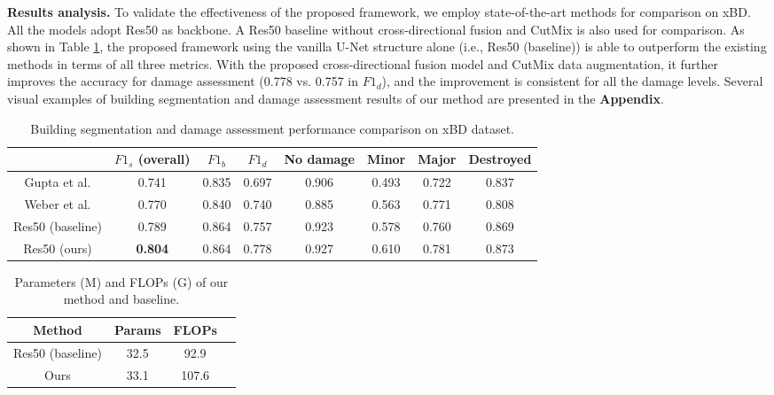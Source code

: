 \documentclass{article}
\begin{document}
\textbf{Results analysis.}
To validate the effectiveness of the proposed framework, we employ state-of-the-art methods for comparison on xBD. All the models adopt Res50 as backbone. A Res50 baseline without cross-directional fusion and CutMix is also used for comparison. As shown in Table \ref{tabResults}, the proposed framework using the vanilla U-Net structure alone (i.e., Res50 (baseline)) is able to outperform the existing methods in terms of all three metrics. With the proposed cross-directional fusion model and CutMix data augmentation, it further improves the accuracy for damage assessment (0.778 vs. 0.757 in $F1_d$), and the improvement is consistent for all the damage levels. 
Several visual examples of building segmentation and damage assessment results of our method are presented in the \textbf{Appendix}. 
\begin{table}
  \caption{Building segmentation and damage assessment performance comparison on xBD dataset.}
  \footnotesize
  \centering
  \begin{tabular}{cccccccc}
    \toprule
         & $F1_s$ (overall) & $F1_b$ & $F1_d$  & No damage    & Minor & Major & Destroyed \\
    \midrule
    Gupta et al. \cite{gupta2020rescuenet} & 0.741 & 0.835 &	0.697 &	0.906 &	0.493 &	0.722 &	0.837 \\
   Weber et al. \cite{weber2020building}  & 0.770 &	0.840 &	0.740 &	0.885 &	0.563 &	0.771 &	0.808   \\
   Res50 (baseline) & 0.789 & 0.864 &	0.757 &	0.923 &	0.578 &	0.760 &	0.869  \\
   Res50 (ours) &  \textbf{0.804} &	0.864 &	0.778 &	0.927 &	0.610 &	0.781 &	0.873   \\
    \bottomrule
  \end{tabular}
    \label{tabResults}
\end{table}



\begin{wraptable}{r}{0.37\textwidth}
\vspace{-\intextsep}
\footnotesize
  \caption{Parameters (M) and FLOPs (G) of our method and baseline.}
  \vspace{-0.3cm}
  \begin{center}
  \setlength\tabcolsep{2.0pt} 
  \renewcommand{\arraystretch}{0.4}\begin{tabular}{cccc}
    \toprule
    \textbf{Method}     & Params    & FLOPs  \\
    \midrule
     Res50 (baseline)   & 32.5  & 92.9  \\
     Ours    & 33.1  &  107.6     \\
    \bottomrule
  \end{tabular}
  \vspace{-0.3cm}
  \end{center}
\label{tabParam}
\end{wraptable}
\end{document}
